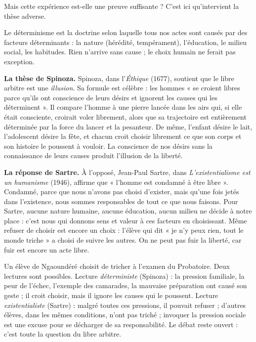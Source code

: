 \documentclass[11pt]{article}
\newcommand{\cle}[1]{{\popxbold\color{popdark}#1}}
\begin{document}
Mais cette expérience est-elle une preuve suffisante ? C'est ici qu'intervient la thèse adverse.

\begin{definition}[Déterminisme]
Le \cle{déterminisme} est la doctrine selon laquelle tous nos actes sont causés par des facteurs déterminants : la nature (hérédité, tempérament), l'éducation, le milieu social, les habitudes. Rien n'arrive sans cause ; le choix humain ne ferait pas exception.
\end{definition}

\textbf{La thèse de Spinoza.} Spinoza, dans l'\emph{Éthique} (1677), soutient que le libre arbitre est une \emph{illusion}. Sa formule est célèbre : les hommes « se croient libres parce qu'ils ont conscience de leurs désirs et ignorent les causes qui les déterminent ». Il compare l'homme à une pierre lancée dans les airs qui, si elle était consciente, croirait voler librement, alors que sa trajectoire est entièrement déterminée par la force du lancer et la pesanteur. De même, l'enfant désire le lait, l'adolescent désire la fête, et chacun croit choisir librement ce que son corps et son histoire le poussent à vouloir. La conscience de nos désirs sans la connaissance de leurs causes produit l'illusion de la liberté.

\textbf{La réponse de Sartre.} À l'opposé, Jean-Paul Sartre, dans \emph{L'existentialisme est un humanisme} (1946), affirme que « l'homme est \cle{condamné à être libre} ». Condamné, parce que nous n'avons pas choisi d'exister, mais qu'une fois jetés dans l'existence, nous sommes responsables de tout ce que nous faisons. Pour Sartre, aucune nature humaine, aucune éducation, aucun milieu ne décide à notre place : c'est nous qui donnons sens et valeur à ces facteurs en choisissant. Même refuser de choisir est encore un choix : l'élève qui dit « je n'y peux rien, tout le monde triche » a choisi de suivre les autres. On ne peut pas fuir la liberté, car fuir est encore un acte libre.

\begin{exemplebox}
Un élève de Ngaoundéré choisit de tricher à l'examen du Probatoire. Deux lectures sont possibles. Lecture \emph{déterministe} (Spinoza) : la pression familiale, la peur de l'échec, l'exemple des camarades, la mauvaise préparation ont causé son geste ; il croit choisir, mais il ignore les causes qui le poussent. Lecture \emph{existentialiste} (Sartre) : malgré toutes ces pressions, il pouvait refuser ; d'autres élèves, dans les mêmes conditions, n'ont pas triché ; invoquer la pression sociale est une excuse pour se décharger de sa responsabilité. Le débat reste ouvert : c'est toute la question du libre arbitre.
\end{exemplebox}
\end{document}
